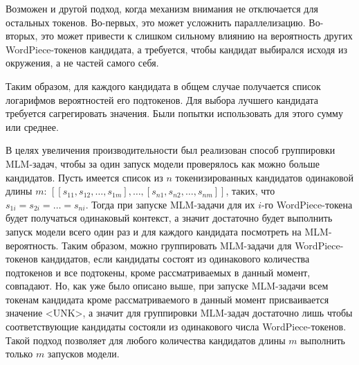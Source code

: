 Возможен и другой подход, когда механизм внимания не отключается для остальных токенов. Во-первых, это может усложнить параллелизацию. Во-вторых, это может привести к слишком сильному влиянию на вероятность других WordPiece-токенов кандидата, а требуется, чтобы кандидат выбирался исходя из окружения, а не частей самого себя.

Таким образом, для каждого кандидата в общем случае получается список логарифмов вероятностей его подтокенов. Для выбора лучшего кандидата требуется сагрегировать значения. Были попытки использовать для этого сумму или среднее.

В целях увеличения производительности был реализован способ группировки MLM-задач, чтобы за один запуск модели проверялось как можно больше кандидатов.
Пусть имеется список из $n$ токенизированных кандидатов одинаковой длины $m$: $[[s_{1 1}, s_{1 2}, \dots, s_{1 m}], \dots, [s_{n 1}, s_{n 2}, \dots, s_{n m}]]$, таких, что $s_{1 i} = s_{2 i} = \dots = s_{n i}$.  Тогда при запуске MLM-задачи для их $i$-го WordPiece-токена будет получаться одинаковый контекст, а значит достаточно будет выполнить запуск модели всего один раз и для каждого кандидата посмотреть на MLM-вероятность. Таким образом, можно группировать MLM-задачи для WordPiece-токенов кандидатов, если кандидаты состоят из одинакового количества подтокенов и все подтокены, кроме рассматриваемых в данный момент, совпадают. Но, как уже было описано выше, при запуске MLM-задачи всем токенам кандидата кроме рассматриваемого в данный момент присваивается значение <UNK>, а значит для группировки MLM-задач достаточно лишь чтобы соответствующие кандидаты состояли из одинакового числа WordPiece-токенов. Такой подход позволяет для любого количества кандидатов длины $m$ выполнить только $m$ запусков модели.



